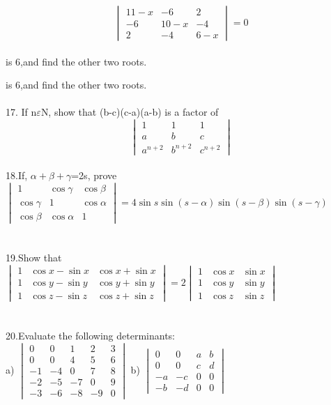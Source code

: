 \documentclass[a4paper,11pt]{amsbook}
\begin{document}

\vspace*{10mm}
$$
\begin{vmatrix} 
11-x & -6&2 \\
-6 & 10-x & -4\\
2& -4 & 6-x
\end{vmatrix}
=0
$$
\\


is 6,and find the other two roots.

is 6,and find the other two roots.\\
\\
17. If n$\varepsilon$N, show that (b-c)(c-a)(a-b) is a factor of\\
$$
\begin{vmatrix}
1&1&1\\
a&b&c\\
a^{n+2}&b^{n+2}&c^{n+2}
\end{vmatrix}
$$
\\
18.If, $\alpha+\beta+\gamma$=2s, prove\\

$
\begin{vmatrix}
1&\cos\gamma&\cos\beta\\
\cos\gamma&1&\cos\alpha\\
\cos\beta&\cos\alpha&1
\end{vmatrix}
=4\sin{s}\sin{(s-\alpha)}\sin{(s-\beta)}\sin{(s-\gamma)}
$
\\
\\
\\
19.Show that
\\

$
\begin{vmatrix}
1&\cos{x}-\sin{x}&\cos{x}+\sin{x}\\
1&\cos{y}-\sin{y}&\cos{y}+\sin{y}\\
1&\cos{z}-\sin{z}&\cos{z}+\sin{z}
\end{vmatrix}
=2
\begin{vmatrix}
1&\cos{x}&\sin{x}\\
1&\cos{y}&\sin{y}\\
1&\cos{z}&\sin{z}
\end{vmatrix}
$
\\
\\
\\
20.Evaluate the following determinants:
\\

a)
$
\begin{vmatrix}
0&0&1&2&3\\
0&0&4&5&6\\
-1&-4&0&7&8\\
-2&-5&-7&0&9\\
-3&-6&-8&-9&0
\end{vmatrix}
$
\hspace{30mm} b)
$
\begin{vmatrix}
0&0&a&b\\
0&0&c&d\\
-a&-c&0&0\\
-b&-d&0&0
\end{vmatrix}
$
\\
\end{document}
